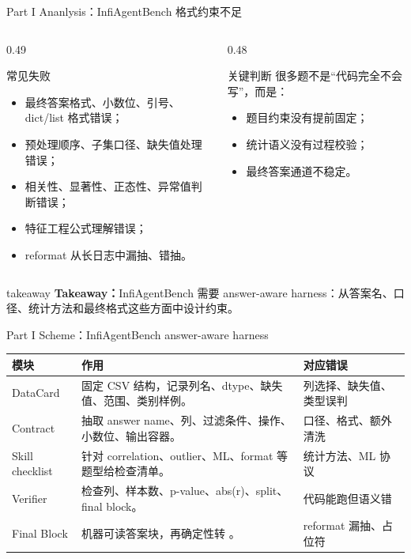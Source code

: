 \documentclass[aspectratio=169,UTF8]{ctexbeamer}
\newcommand{\code}[1]{\texttt{\detokenize{#1}}}
\newcommand{\takeaway}[1]{%
  \vspace{0.35em}
  \begin{beamercolorbox}[wd=\textwidth,sep=0.75ex,rounded=true]{takeaway}
    \textbf{Takeaway：}#1
  \end{beamercolorbox}
}
\begin{document}
\begin{frame}{Part I Ananlysis：InfiAgentBench 格式约束不足}
\begin{columns}[T]
\begin{column}{0.49\textwidth}
\begin{block}{常见失败}
\begin{itemize}
  \item 最终答案格式、小数位、引号、dict/list 格式错误；
  \item 预处理顺序、子集口径、缺失值处理错误；
  \item 相关性、显著性、正态性、异常值判断错误；
  \item 特征工程公式理解错误；
  \item reformat 从长日志中漏抽、错抽。
\end{itemize}
\end{block}
\end{column}
\begin{column}{0.48\textwidth}
\begin{alertblock}{关键判断}
很多题不是“代码完全不会写”，而是：
\begin{itemize}
  \item 题目约束没有提前固定；
  \item 统计语义没有过程校验；
  \item 最终答案通道不稳定。
\end{itemize}
\end{alertblock}
\end{column}
\end{columns}
\takeaway{InfiAgentBench 需要 answer-aware harness：从答案名、口径、统计方法和最终格式这些方面中设计约束。}
\end{frame}

\begin{frame}{Part I Scheme：InfiAgentBench answer-aware harness}
\footnotesize
\begin{tabularx}{\textwidth}{p{} X p{}}
\toprule
模块 & 作用 & 对应错误 \\
\midrule
DataCard & 固定 CSV 结构，记录列名、dtype、缺失值、范围、类别样例。 & 列选择、缺失值、类型误判 \\
Contract & 抽取 answer name、列、过滤条件、操作、小数位、输出容器。 & 口径、格式、额外清洗 \\
Skill checklist & 针对 correlation、outlier、ML、format 等题型给检查清单。 & 统计方法、ML 协议 \\
Verifier & 检查列、样本数、p-value、abs(r)、split、final block。 & 代码能跑但语义错 \\
Final Block & 机器可读答案块，再确定性转 \code{@answer[value]}。 & reformat 漏抽、占位符 \\
\bottomrule
\end{tabularx}
\end{frame}
\end{document}
